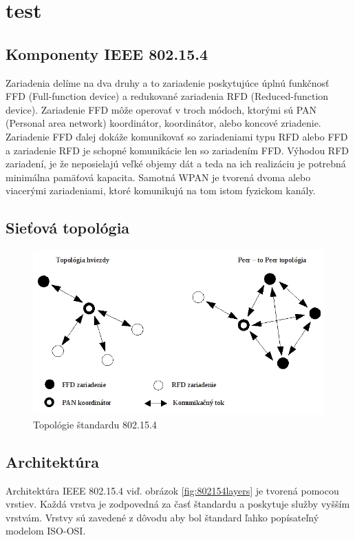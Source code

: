 \documentclass[11pt,twoside,a4paper]{book}
\begin{document}
\chapter{test}


	
\section{Komponenty IEEE 802.15.4}
Zariadenia delíme na dva druhy a to zariadenie poskytujúce úplnú funkčnosť FFD (Full-function device) a redukované zariadenia RFD (Reduced-function device). Zariadenie FFD môže operovať v troch módoch, ktorými sú PAN (Personal area network) koordinátor, koordinátor, alebo koncové zriadenie. Zariadenie FFD ďalej dokáže komunikovať so zariadeniami typu RFD alebo FFD a zariadenie RFD je schopné komunikácie len so zariadením FFD. Výhodou RFD zariadení, je že neposielajú veľké objemy dát a teda na ich realizáciu je potrebná minimálna pamäťová kapacita. 
Samotná WPAN je tvorená dvoma alebo viacerými zariadeniami, ktoré komunikujú na tom istom fyzickom kanály.

\newpage 

\section{Sieťová topológia}

\begin{figure}[h]
 \centering
 \includegraphics[width=12cm]{./figures/topologies802154.png}
 \caption{Topológie štandardu 802.15.4}
 \label{fig:80215topologies}
\end{figure}


\section{Architektúra}
Architektúra IEEE 802.15.4 viď. obrázok \ref{fig:802154layers} je tvorená pomocou vrstiev. Každá vrstva je zodpovedná za časť štandardu a poskytuje služby vyšším vrstvám. Vrstvy sú zavedené z dôvodu aby bol štandard ľahko popísateľný modelom ISO-OSI. 
\end{document}
